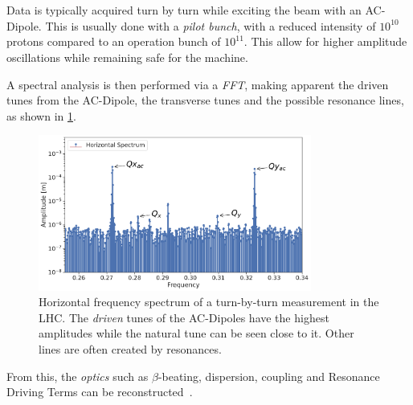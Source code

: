 \section{}



\subsection{}

Data is typically acquired turn by turn while exciting the beam with an AC-Dipole. This is usually
done with a \textit{pilot bunch}, with a reduced intensity of $10^{10}$ protons compared to
an operation bunch of $10^{11}$. This allow for higher amplitude oscillations while remaining safe 
for the machine.

A spectral analysis is then performed via a \textit{FFT}, making apparent the driven tunes from the 
AC-Dipole, the transverse tunes and the possible resonance lines, as shown in
\cref{fig:optics_measurements:tbt_data:spectrum}.

\begin{figure}[H]
    \centering
    \includegraphics[width=0.8\textwidth]{./images/basic_spectrum.pdf}
    \caption{Horizontal frequency spectrum of a turn-by-turn measurement in the LHC. The 
    \textit{driven} tunes of the AC-Dipoles have the highest amplitudes while the natural tune can
    be seen close to it. Other lines are often created by resonances.}
    \label{fig:optics_measurements:tbt_data:spectrum}
\end{figure}

From this, the \textit{optics} such as $\beta$-beating, dispersion, coupling and Resonance Driving
Terms can be reconstructed~\cite{catalan-lasheras_linear_2004}.



